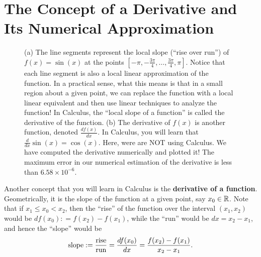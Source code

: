 \section{The Concept of a Derivative and Its Numerical Approximation}
\label{sec:NumericalDerivativesScalar}

\begin{figure}[hbt]%
\centering
{}
    \caption[]{(a) The line segments represent the local slope (``rise over run'') of $f(x)=\sin(x)$ at the points $[-\pi, -\frac{3 \pi}{4}, \ldots, \frac{3 \pi}{4}, \pi] $. Notice that each line segment is also a local linear approximation of the function. In a practical sense, what this means is that in a small region about a given point, we can replace the function with a local linear equivalent and then use linear techniques to analyze the function! In Calculus, the ``local slope of a function'' is called the derivative of the function. (b) The derivative of $f(x)$ is another function, denoted $\frac{df(x)}{dx}$. In Calculus, you will learn that $\frac{d}{dx}\sin(x) = \cos(x)$. Here, were are NOT using Calculus. We have computed the derivative numerically and plotted it! The maximum error in our numerical estimation of the derivative is less than $6.58 \times 10^{-6}$. }
    \label{fig:DerivativesExample01}
\end{figure}

Another concept that you will learn in Calculus is the \textbf{derivative of a function}. Geometrically, it is the slope of the function at a given point, say $x_0 \in \mathbb R$.  Note that if $x_1 \le x_0 < x_2$, then the ``rise'' of the function over the interval $(x_1, x_2)$ would be $d f(x_0): =f(x_2) - f(x_1)$, while the ``run'' would be $d x = x_2 - x_1$, and hence the ``slope'' would be 
$${\rm slope} := \frac{{\rm rise}}{{\rm run}}=\frac{d f (x_0)}{d x} = \frac{f(x_2) - f(x_1)}{x_2 - x_1}. $$


